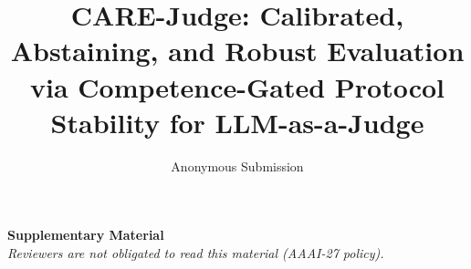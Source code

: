\documentclass[letterpaper]{article} %
\title{CARE-Judge: Calibrated, Abstaining, and Robust Evaluation via Competence-Gated Protocol Stability for LLM-as-a-Judge}
\author{
    Anonymous Submission
}
\begin{document}
\maketitle











\clearpage
\appendix
\onecolumn
\begin{center}
{\large\bf Supplementary Material}\\[2pt]
\emph{Reviewers are not obligated to read this material (AAAI-27 policy).}
\end{center}
\FloatBarrier

\end{document}
